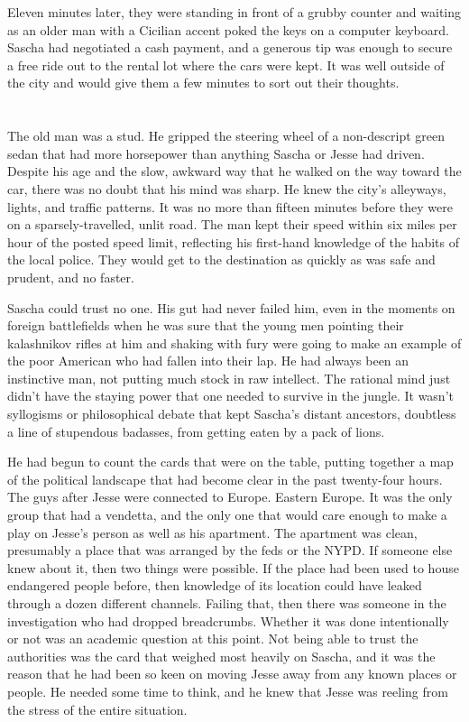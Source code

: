 \documentclass[12pt]{book}
\begin{document}
Eleven minutes later, they were standing in front of a grubby counter and waiting as an older man with a Cicilian accent poked the keys on a computer keyboard.  Sascha had negotiated a cash payment, and a generous tip was enough to secure a free ride out to the rental lot where the cars were kept.  It was well outside of the city and would give them a few minutes to sort out their thoughts.

\chapter{}

The old man was a stud.  He gripped the steering wheel of a non-descript green sedan that had more horsepower than anything Sascha or Jesse had driven.  Despite his age and the slow, awkward way that he walked on the way toward the car, there was no doubt that his mind was sharp.  He knew the city's alleyways, lights, and traffic patterns.  It was no more than fifteen minutes before they were on a sparsely-travelled, unlit road.  The man kept their speed within six miles per hour of the posted speed limit, reflecting his first-hand knowledge of the habits of the local police.  They would get to the destination as quickly as was safe and prudent, and no faster.

Sascha could trust no one.  His gut had never failed him, even in the moments on foreign battlefields when he was sure that the young men pointing their kalashnikov rifles at him and shaking with fury were going to make an example of the poor American who had fallen into their lap.  He had always been an instinctive man, not putting much stock in raw intellect.  The rational mind just didn't have the staying power that one needed to survive in the jungle.  It wasn't syllogisms or philosophical debate that kept Sascha's distant ancestors, doubtless a line of stupendous badasses, from getting eaten by a pack of lions.

He had begun to count the cards that were on the table, putting together a map of the political landscape that had become clear in the past twenty-four hours.  The guys after Jesse were connected to Europe.  Eastern Europe.  It was the only group that had a vendetta, and the only one that would care enough to make a play on Jesse's person as well as his apartment.  The apartment was clean, presumably a place that was arranged by the feds or the NYPD.  If someone else knew about it, then two things were possible.  If the place had been used to house endangered people before, then knowledge of its location could have leaked through a dozen different channels.  Failing that, then there was someone in the investigation who had dropped breadcrumbs.  Whether it was done intentionally or not was an academic question at this point.  Not being able to trust the authorities was the card that weighed most heavily on Sascha, and it was the reason that he had been so keen on moving Jesse away from any known places or people.  He needed some time to think, and he knew that Jesse was reeling from the stress of the entire situation.
\end{document}
